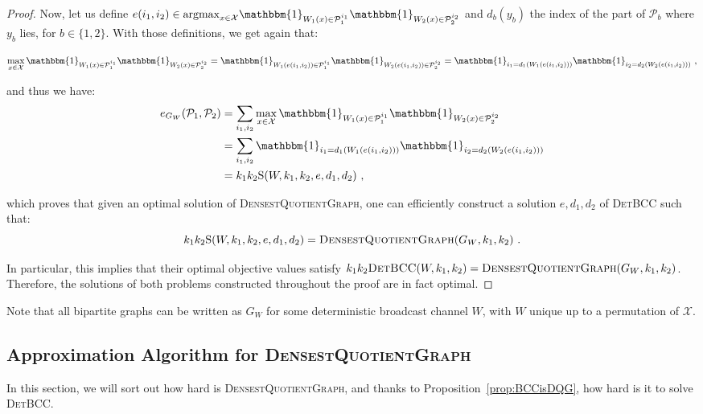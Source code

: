 \begin{proof}
Now, let us define $e(i_1,i_2) \in \text{argmax}_{x \in \mathcal{X}}\mathbbm{1}_{W_1(x) \in \mathcal{P}_1^{i_1}}\mathbbm{1}_{W_2(x) \in \mathcal{P}_2^{i_2}}$ and $d_b(y_b)$ the index of the part of $\mathcal{P}_b$ where $y_b$ lies, for $b \in \{1,2\}$. With those definitions, we get again that:

\[ \max_{x \in \mathcal{X}}\mathbbm{1}_{W_1(x) \in \mathcal{P}_1^{i_1}}\mathbbm{1}_{W_2(x) \in \mathcal{P}_2^{i_2}} = \mathbbm{1}_{W_1(e(i_1,i_2)) \in \mathcal{P}_1^{i_1}}\mathbbm{1}_{W_2(e(i_1,i_2)) \in \mathcal{P}_2^{i_2}} = \mathbbm{1}_{i_1=d_1(W_1(e(i_1,i_2)))}\mathbbm{1}_{i_2=d_2(W_2(e(i_1,i_2)))} \ ,\]

and thus we have:
\begin{equation}
  \begin{aligned}
e_{G_W}(\mathcal{P}_1,\mathcal{P}_2) &=  \sum_{i_1,i_2} \max_{x \in \mathcal{X}}\mathbbm{1}_{W_1(x) \in \mathcal{P}_1^{i_1}}\mathbbm{1}_{W_2(x) \in \mathcal{P}_2^{i_2}}\\
&= \sum_{i_1,i_2} \mathbbm{1}_{i_1=d_1(W_1(e(i_1,i_2)))}\mathbbm{1}_{i_2=d_2(W_2(e(i_1,i_2)))}\\
&= k_1k_2\mathrm{S}(W,k_1,k_2,e,d_1,d_2) \ ,
    \end{aligned}
\end{equation}

which proves that given an optimal solution of \textsc{DensestQuotientGraph}, one can efficiently construct a solution $e,d_1,d_2$ of \textsc{DetBCC} such that:
\[ k_1k_2\mathrm{S}(W,k_1,k_2,e,d_1,d_2) = \textsc{DensestQuotientGraph}(G_W,k_1,k_2) \ . \]

In particular, this implies that their optimal objective values satisfy $k_1k_2\textsc{DetBCC}(W,k_1,k_2) = \textsc{DensestQuotientGraph}(G_W,k_1,k_2)$. Therefore, the solutions of both problems constructed throughout the proof are in fact optimal.
\end{proof}

\begin{rk}
  Note that all bipartite graphs can be written as $G_W$ for some deterministic broadcast channel $W$, with $W$ unique up to a permutation of $\mathcal{X}$.
\end{rk}
\subsection{Approximation Algorithm for \textsc{DensestQuotientGraph}}
In this section, we will sort out how hard is \textsc{DensestQuotientGraph}, and thanks to Proposition~\ref{prop:BCCisDQG}, how hard is it to solve \textsc{DetBCC}.

